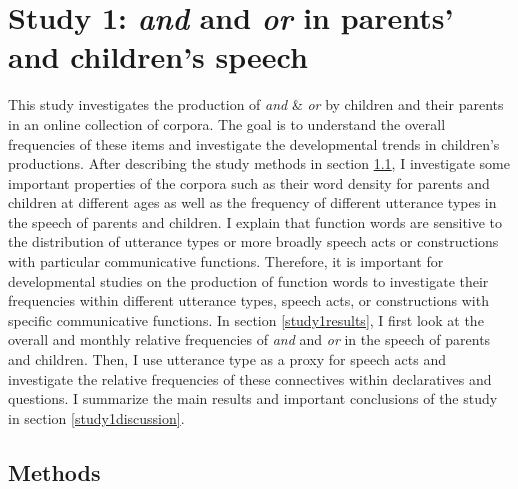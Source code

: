 \documentclass[oneside]{report}
\theoremstyle{definition}
\theoremstyle{definition}
\theoremstyle{definition}
\theoremstyle{remark}
\begin{document}
\section{\texorpdfstring{Study 1: \emph{and} and \emph{or} in parents'
and children's
speech}{Study 1: and and or in parents' and children's speech}}\label{study-1-and-and-or-in-parents-and-childrens-speech}

This study investigates the production of \emph{and} \& \emph{or} by
children and their parents in an online collection of corpora. The goal
is to understand the overall frequencies of these items and investigate
the developmental trends in children's productions. After describing the
study methods in section \ref{study1methods}, I investigate some
important properties of the corpora such as their word density for
parents and children at different ages as well as the frequency of
different utterance types in the speech of parents and children. I
explain that function words are sensitive to the distribution of
utterance types or more broadly speech acts or constructions with
particular communicative functions. Therefore, it is important for
developmental studies on the production of function words to investigate
their frequencies within different utterance types, speech acts, or
constructions with specific communicative functions. In section
\ref{study1results}, I first look at the overall and monthly relative
frequencies of \emph{and} and \emph{or} in the speech of parents and
children. Then, I use utterance type as a proxy for speech acts and
investigate the relative frequencies of these connectives within
declaratives and questions. I summarize the main results and important
conclusions of the study in section \ref{study1discussion}.

\subsection{Methods}\label{study1methods}
\end{document}
